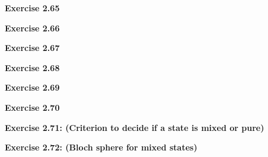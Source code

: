 \documentclass{article}
\begin{document}
\bigskip

\begin{framed}
    \noindent \textbf{Exercise 2.65}
    
    \medskip
    
    
\end{framed}

\bigskip

\begin{framed}
    \noindent \textbf{Exercise 2.66}
    
    \medskip
    
    
\end{framed}

\bigskip

\begin{framed}
    \noindent \textbf{Exercise 2.67}
    
    \medskip
    
    
\end{framed}

\bigskip

\begin{framed}
    \noindent \textbf{Exercise 2.68}
    
    \medskip
    
    
\end{framed}

\bigskip

\begin{framed}
    \noindent \textbf{Exercise 2.69}
    
    \medskip
    
    
\end{framed}

\bigskip

\begin{framed}
    \noindent \textbf{Exercise 2.70}
    
    \medskip
    
    
\end{framed}

\bigskip

\begin{framed}
    \noindent \textbf{Exercise 2.71: (Criterion to decide if a state is mixed or pure)}
    
    \medskip
    
    
\end{framed}

\bigskip

\begin{framed}
    \noindent \textbf{Exercise 2.72: (Bloch sphere for mixed states)}
    
    \medskip
    
    
\end{framed}
\end{document}
